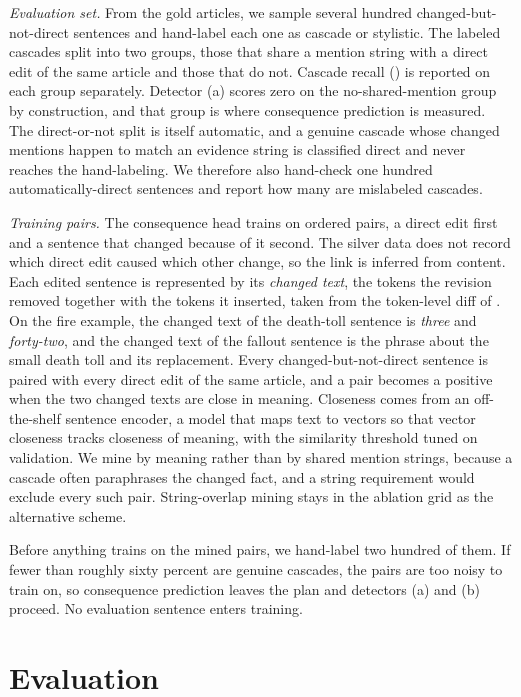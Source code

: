 \documentclass[]{paper}
\begin{document}
\emph{Evaluation set.} From the gold articles, we sample several hundred changed-but-not-direct sentences and hand-label each one as cascade or stylistic. The labeled cascades split into two groups, those that share a mention string with a direct edit of the same article and those that do not. Cascade recall () is reported on each group separately. Detector (a) scores zero on the no-shared-mention group by construction, and that group is where consequence prediction is measured. The direct-or-not split is itself automatic, and a genuine cascade whose changed mentions happen to match an evidence string is classified direct and never reaches the hand-labeling. We therefore also hand-check one hundred automatically-direct sentences and report how many are mislabeled cascades.

\emph{Training pairs.} The consequence head trains on ordered pairs, a direct edit first and a sentence that changed because of it second. The silver data does not record which direct edit caused which other change, so the link is inferred from content. Each edited sentence is represented by its \emph{changed text}, the tokens the revision removed together with the tokens it inserted, taken from the token-level diff of . On the fire example, the changed text of the death-toll sentence is \emph{three} and \emph{forty-two}, and the changed text of the fallout sentence is the phrase about the small death toll and its replacement. Every changed-but-not-direct sentence is paired with every direct edit of the same article, and a pair becomes a positive when the two changed texts are close in meaning. Closeness comes from an off-the-shelf sentence encoder, a model that maps text to vectors so that vector closeness tracks closeness of meaning, with the similarity threshold tuned on validation. We mine by meaning rather than by shared mention strings, because a cascade often paraphrases the changed fact, and a string requirement would exclude every such pair. String-overlap mining stays in the ablation grid as the alternative scheme.

Before anything trains on the mined pairs, we hand-label two hundred of them. If fewer than roughly sixty percent are genuine cascades, the pairs are too noisy to train on, so consequence prediction leaves the plan and detectors (a) and (b) proceed. No evaluation sentence enters training.

\section{Evaluation}
\label{sec:eval}
\end{document}
